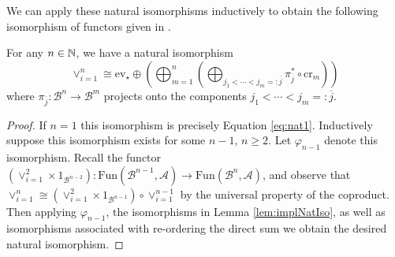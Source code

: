 
We can apply these natural isomorphisms inductively to obtain the following isomorphism of functors given in \cite{Johnson2003DerivingCW}.

\begin{thm}[label=thm:dirSumDecomp]
    For any $n \in \mathbb N$, we have a natural isomorphism
    \begin{equation*}
        \lor_{i=1}^n \cong \text{ev}_\star \oplus \left(\bigoplus_{m=1}^n\left(\bigoplus_{j_1<\cdots < j_m =: \overline{j}}\pi_{\overline{j}}^*\circ \text{cr}_m\right)\right)
    \end{equation*}
    where $\pi_{\overline{j}}:\mathcal{B}^n\rightarrow \mathcal{B}^m$ projects onto the components $j_1 < \cdots < j_m=:\overline{j}$.
\end{thm}
\begin{proof}
    If $n = 1$ this isomorphism is precisely Equation \eqref{eq:nat1}. Inductively suppose this isomorphism exists for some $n-1$, $n \geq 2$. Let $\varphi_{n-1}$ denote this isomorphism. Recall the functor $(\lor_{i=1}^2\times 1_{\mathcal{B}^{n-2}}):\text{Fun}(\mathcal{B}^{n-1},\mathcal{A})\rightarrow \text{Fun}(\mathcal{B}^n,\mathcal{A})$, and observe that $\lor_{i=1}^n \cong (\lor_{i=1}^2\times 1_{\mathcal{B}^{n-1}})\circ \lor_{i=1}^{n-1}$ by the universal property of the coproduct. Then applying $\varphi_{n-1}$, the isomorphisms in Lemma \ref{lem:implNatIso}, as well as isomorphisms associated with re-ordering the direct sum we obtain the desired natural isomorphism.
\end{proof}

